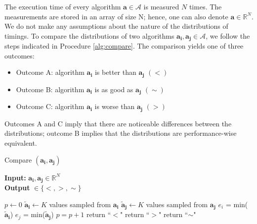 \documentclass[conference]{IEEEtran}
\newcommand{\p}[1]{{\color{blue} Pdj: #1}}
\begin{document}
The execution time of every algorithm $\mathbf{a} \in \mathcal{A}$ is
measured $N$ times. The measurements are stored in an array of size N; hence, one can also denote
$\mathbf{a} \in \mathbb{R}^N$. We do not make any assumptions about the nature of the distributions of timings. To compare the
distributions of two algorithms $\mathbf{a_i},\mathbf{a_j} \in \mathcal{A}$, we follow the steps indicated in Procedure
\ref{alg:compare}.
%
The comparison yields one of three outcomes:
\begin{itemize}
\item Outcome A: algorithm $\mathbf{a_i}$ is better than $\mathbf{a_j}$ $(<)$
\item Outcome B: algorithm  $\mathbf{a_i}$ is as good as $\mathbf{a_j}$ $(\sim)$
\item Outcome C: algorithm  $\mathbf{a_i}$ is worse than $\mathbf{a_j}$ $(>)$
\end{itemize}
Outcomes A and C imply that there are noticeable differences between the distributions; outcome B implies that the
distributions are performance-wise equivalent. 
\begin{algorithm}
	\caption{Compare $(\mathbf{a_i}, \mathbf{a_j})$ }
	\label{alg:compare}
	\hspace*{\algorithmicindent} \textbf{Input: } $ \mathbf{a_i}, \mathbf{a_j} \in \mathbb{R}^{N}$ \\
	\hspace*{\algorithmicindent} \textbf{Output } $\in  \{<,>,\sim \}$
	\begin{algorithmic}[1] 
		\State $p \leftarrow 0$
        \State $\mathbf{\tilde{a}_i} \leftarrow K$ values sampled from $\mathbf{a_i}$
        \State $\mathbf{\tilde{a}_j} \leftarrow K$ values sampled from $\mathbf{a_j}$
		\State $e_i$ = min($\mathbf{\tilde{a}_i}$)
		\State $e_j$ = min($\mathbf{\tilde{a}_j}$)
		\State $p=p+1$
		\EndIf
		\EndFor
		\State return ``$<$"    
		\State return ``$>$" 
		\Else
		\State return ``$\sim$" 
		\EndIf
	\end{algorithmic}
      \end{algorithm}
\end{document}
